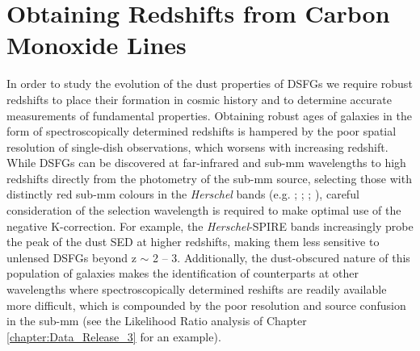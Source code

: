 \section{Obtaining Redshifts from Carbon Monoxide Lines}

In order to study the evolution of the dust properties of DSFGs we require robust redshifts to place their formation in cosmic history and to determine accurate measurements of fundamental properties. Obtaining robust ages of galaxies in the form of spectroscopically determined redshifts is hampered by the poor spatial resolution of single-dish observations, which worsens with increasing redshift. While DSFGs can be discovered at far-infrared and sub-mm wavelengths to high redshifts directly from the photometry of the sub-mm source, selecting those with distinctly red sub-mm colours in the \textit{Herschel} bands (e.g. \citealt{Dowell_2014}; \citealt{Ivison_2016}; \citealt{Donevski_2018}; \citealt{Duivenvoorden_2018}), careful consideration of the selection wavelength is required to make optimal use of the negative K-correction. For example, the \textit{Herschel}-SPIRE bands increasingly probe the peak of the dust SED at higher redshifts, making them less sensitive to unlensed DSFGs beyond z $\sim$ 2 -- 3. Additionally, the dust-obscured nature of this population of galaxies makes the identification of counterparts at other wavelengths where spectroscopically determined reshifts are readily available more difficult, which is compounded by the poor resolution and source confusion in the sub-mm (see the Likelihood Ratio analysis of Chapter \ref{chapter:Data_Release_3} for an example).

